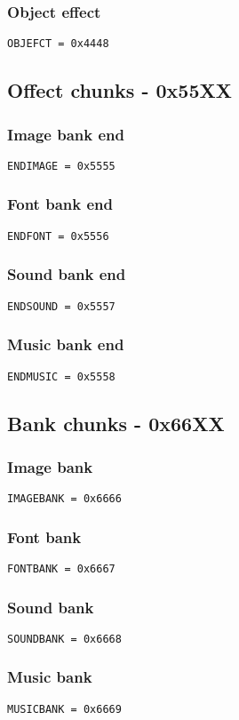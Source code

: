 \documentclass{article}
\begin{document}
\subsubsection{Object effect}
\verb|OBJEFCT = 0x4448|

\subsection{Offect chunks - 0x55XX}
\label{subsec:offset-chunks}

\subsubsection{Image bank end}
\verb|ENDIMAGE = 0x5555|

\subsubsection{Font bank end}
\verb|ENDFONT = 0x5556|

\subsubsection{Sound bank end}
\verb|ENDSOUND = 0x5557|

\subsubsection{Music bank end}
\verb|ENDMUSIC = 0x5558|

\subsection{Bank chunks - 0x66XX}

\subsubsection{Image bank}
\verb|IMAGEBANK = 0x6666|

\subsubsection{Font bank}
\verb|FONTBANK = 0x6667|

\subsubsection{Sound bank}
\verb|SOUNDBANK = 0x6668|

\subsubsection{Music bank}
\verb|MUSICBANK = 0x6669|
\end{document}
